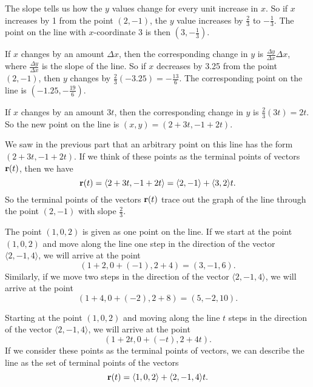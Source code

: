 \begin{activitySolution}
    \ba
      \item The slope tells us how the $y$ values change for every unit increase in $x$. So if $x$ increases by 1 from the point $(2,-1)$, the $y$ value increases by $\frac{2}{3}$ to $-\frac{1}{3}$. The point on the line with $x$-coordinate $3$ is then $\left(3,-\frac{1}{3}\right)$.

        \item If $x$ changes by an amount $\Delta x$, then the corresponding change in $y$ is $\frac{\Delta y}{\Delta x} \Delta x$, where $\frac{\Delta y}{\Delta x}$ is the slope of the line. So if $x$ decreases by 3.25 from the point $(2,-1)$, then $y$ changes by ${\frac{2}{3}(-3.25) = -\frac{13}{6}}$. The corresponding point on the line is $\left(-1.25, -\frac{19}{6}\right)$.


        \item If $x$ changes by an amount $3t$, then the corresponding change in $y$ is $\frac{2}{3}(3t) = 2t$. So the new point on the line is ${(x,y) = (2+3t, -1+2t)}$.


        \item We saw in the previous part that an arbitrary point on this line has the form $(2+3t, -1+2t)$. If we think of these points as the terminal points of vectors $\mathbf{r}(t)$, then we have
\[\mathbf{r}(t) = \langle 2+3t, -1+2t \rangle =\langle 2,-1 \rangle + \langle 3,2 \rangle t.\]
So the terminal points of the vectors $\mathbf{r}(t)$ trace out the graph of the line through the point $(2,-1)$ with slope $\frac{2}{3}$.


    \item The point $(1,0,2)$ is given as one point on the line. If we start at the point $(1,0,2)$ and move along the line one step in the direction of the vector $\langle 2, -1, 4 \rangle$, we will arrive at the point
 \[(1+2, 0+(-1), 2+4) = (3,-1,6).\]
Similarly, if we move two steps in the direction of the vector $\langle 2, -1, 4 \rangle$, we will arrive at the point
\[(1+4, 0+(-2), 2+8) = (5,-2,10).\]


        \item Starting at the point $(1,0,2)$ and moving along the line $t$ steps in the direction of the vector $\langle 2, -1, 4 \rangle$, we will arrive at the point
\[(1+2t, 0+(-t), 2+4t).\]
If we consider these points as the terminal points of vectors, we can describe the line as the set of terminal points of the vectors
\[\mathbf{r}(t) = \langle 1,0,2 \rangle + \langle 2,-1,4\rangle t.\]


    \ea


\end{activitySolution}

\afterpa 